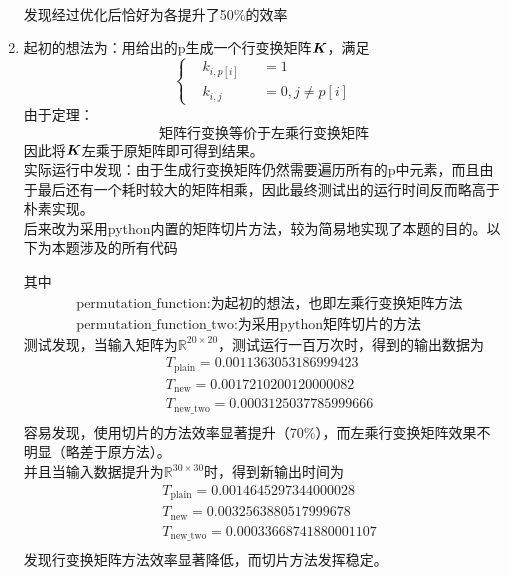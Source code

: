 \documentclass[answers]{exam}  %
\begin{document}
\begin{questions}
\begin{solution}
\begin{enumerate}
\[\begin{aligned}
                    \end{aligned}
            \]
            发现经过优化后恰好为各提升了50\%的效率
            \item 起初的想法为：用给出的p生成一个行变换矩阵$\boldsymbol{K}$，满足
            \[\left\{
                    \begin{aligned}
                        &k_{i,p[i]}&&=1\\
                        &k_{i,j}   &&=0,j\not=p[i]
                    \end{aligned}
            \right.
            \]
            由于定理：
            \[\text{矩阵行变换等价于左乘行变换矩阵}\]
            因此将$\boldsymbol{K}$左乘于原矩阵即可得到结果。\\
            实际运行中发现：由于生成行变换矩阵仍然需要遍历所有的p中元素，而且由于最后还有一个耗时较大的矩阵相乘，因此最终测试出的运行时间反而略高于朴素实现。\\
            后来改为采用python内置的矩阵切片方法，较为简易地实现了本题的目的。以下为本题涉及的所有代码
            
            其中
            \[
                    \begin{aligned}
                        &\text{permutation\_function}:\text{为起初的想法，也即左乘行变换矩阵方法}\\
                        &\text{permutation\_function\_two}:\text{为采用python矩阵切片的方法}
                    \end{aligned}
            \]
            测试发现，当输入矩阵为$\mathbb R^{20\times20}$，测试运行一百万次时，得到的输出数据为
            \[
                    \begin{aligned}
                        &T_{\text{plain}}   =0.0011363053186999423\\
                        &T_{\text{new}}     =0.0017210200120000082\\
                        &T_{\text{new\_two}} =0.0003125037785999666\\
                    \end{aligned}
            \]
            容易发现，使用切片的方法效率显著提升（70\%），而左乘行变换矩阵效果不明显（略差于原方法）。\\
            并且当输入数据提升为$\mathbb R^{30\times 30}$时，得到新输出时间为
            \[
                \begin{aligned}
                    &T_{\text{plain}}   =0.0014645297344000028\\
                    &T_{\text{new}}     =0.0032563880517999678\\
                    &T_{\text{new\_two}} =0.00033668741880001107\\
                \end{aligned}
            \]
            发现行变换矩阵方法效率显著降低，而切片方法发挥稳定。
        \end{enumerate}
	\end{solution}



\end{questions}
\end{document}
